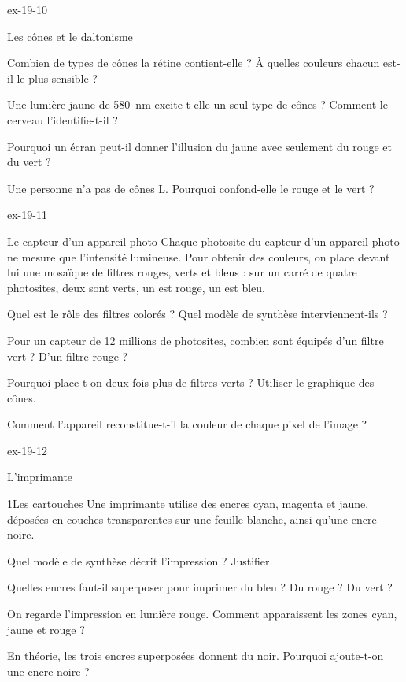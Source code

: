 \begin{blocLivre}{ex-19-10}
\begin{exercice}[2]{Les cônes et le daltonisme}
\begin{questions}
\item Combien de types de cônes la rétine contient-elle ? À quelles couleurs chacun est-il le plus sensible ?
\item Une lumière jaune de \qty{580}{nm} excite-t-elle un seul type de cônes ? Comment le cerveau l'identifie-t-il ?
\item Pourquoi un écran peut-il donner l'illusion du jaune avec seulement du rouge et du vert ?
\item Une personne n'a pas de cônes L. Pourquoi confond-elle le rouge et le vert ?
\end{questions}
\end{exercice}
\end{blocLivre}
\begin{blocLivre}{ex-19-11}
\begin{exercice}[2]{Le capteur d'un appareil photo}
Chaque photosite du capteur d'un appareil photo ne mesure que l'intensité lumineuse. Pour obtenir des couleurs, on place devant lui une
mosaïque de filtres rouges, verts et bleus : sur un carré de quatre photosites, deux sont verts, un est rouge, un est bleu.
\begin{questions}
\item Quel est le rôle des filtres colorés ? Quel modèle de synthèse interviennent-ils ?
\item Pour un capteur de 12 millions de photosites, combien sont équipés d'un filtre vert ? D'un filtre rouge ?
\item Pourquoi place-t-on deux fois plus de filtres verts ? Utiliser le graphique des cônes.
\item Comment l'appareil reconstitue-t-il la couleur de chaque pixel de l'image ?
\end{questions}
\end{exercice}
\end{blocLivre}
\begin{blocLivre}{ex-19-12}
\begin{exercice}[3]{L'imprimante}
\begin{docu}{1}{Les cartouches}
Une imprimante utilise des encres cyan, magenta et jaune, déposées en couches transparentes sur une feuille blanche, ainsi qu'une
encre noire.
\end{docu}
\begin{questions}
\item Quel modèle de synthèse décrit l'impression ? Justifier.
\item Quelles encres faut-il superposer pour imprimer du bleu ? Du rouge ? Du vert ?
\item \initiative On regarde l'impression en lumière rouge. Comment apparaissent les zones cyan, jaune et rouge ?
\item En théorie, les trois encres superposées donnent du noir. Pourquoi ajoute-t-on une encre noire ?
\end{questions}
\end{exercice}
\end{blocLivre}
